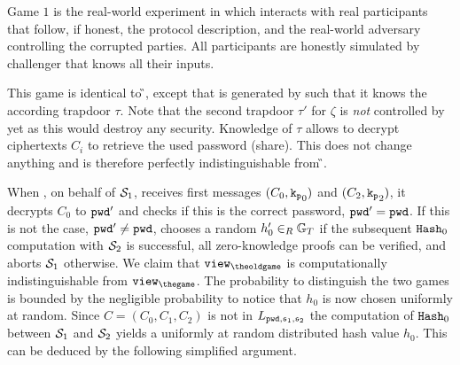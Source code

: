 \Gh Game $1$ is the real-world experiment in which \cZ interacts with real participants that follow, if honest, the protocol description, and the real-world adversary \cA controlling the corrupted parties.
All participants are honestly simulated by challenger \Challenger that knows all their inputs.

\Gh This game is identical to \G{\theoldgame}, except that \crs is generated by \Challenger such that it knows the according trapdoor $\tau$.
Note that the second trapdoor $\tau'$ for $\zeta$ is \emph{not} controlled by \Challenger yet as this would destroy any security.
Knowledge of $\tau$ allows \Challenger to decrypt ciphertexts $C_i$ to retrieve the used password (share).
This does not change anything and is therefore perfectly indistinguishable from \G{\theoldgame}.

\Gh When \Challenger, on behalf of $\mathcal{S}_1$, receives first messages $(C_0, \mathtt{k_p}_0)$ and $(C_2, \mathtt{k_p}_2)$, it decrypts $C_0$ to $\mathtt{pwd}'$ and checks if this is the correct password, \ie $\mathtt{pwd}'=\mathtt{pwd}$.
If this is not the case, $\mathtt{pwd}'\not=\mathtt{pwd}$, \Challenger chooses a random $h'_0\in_R\mathbb{G}_T$ if the subsequent $\mathtt{Hash}_0$ computation with $\mathcal{S}_2$ is successful, \ie all zero-knowledge proofs can be verified, and aborts $\mathcal{S}_1$ otherwise.
We claim that $\view_{\theoldgame}$ is computationally indistinguishable from $\view_{\thegame}$.
The probability to distinguish the two games is bounded by the negligible probability to notice that $h_0$ is now chosen uniformly at random.
Since $C=(C_0, C_1, C_2)$ is not in $L_{\mathtt{pwd}, \mathfrak{s}_1, \mathfrak{s}_2}$ the computation of $\mathtt{Hash}_0$ between $\mathcal{S}_1$ and $\mathcal{S}_2$ yields a uniformly at random distributed hash value $h_0$.
This can be deduced by the following simplified argument.
